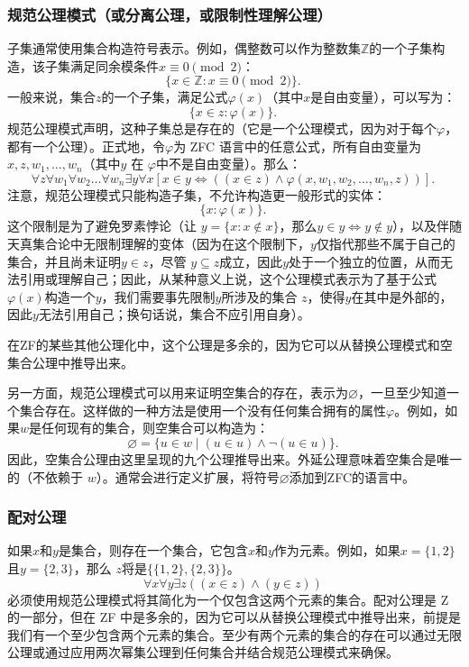 \subsubsection{规范公理模式（或分离公理，或限制性理解公理）}   
子集通常使用集合构造符号表示。例如，偶整数可以作为整数集\( \mathbb{Z} \)的一个子集构造，该子集满足同余模条件\( x \equiv 0 \pmod{2} \)：
\[
\{ x \in \mathbb{Z} : x \equiv 0 \pmod{2} \}.~
\]
一般来说，集合\( z \)的一个子集，满足公式\( \varphi(x) \)（其中\( x \)是自由变量），可以写为：
\[
\{ x \in z : \varphi(x) \}.~
\]
规范公理模式声明，这种子集总是存在的（它是一个公理模式，因为对于每个\( \varphi \)，都有一个公理）。正式地，令\( \varphi \)为 ZFC 语言中的任意公式，所有自由变量为 \( x, z, w_1, \ldots, w_n \)（其中\( y \) 在 \( \varphi \)中不是自由变量）。那么：
\[
\forall z \forall w_1 \forall w_2 \ldots \forall w_n \exists y \forall x \left[ x \in y \Leftrightarrow \left( (x \in z) \land \varphi(x, w_1, w_2, \ldots, w_n, z) \right) \right].~
\]
注意，规范公理模式只能构造子集，不允许构造更一般形式的实体：
\[
\{ x : \varphi(x) \}.~
\]
这个限制是为了避免罗素悖论（让 \( y = \{x : x \notin x\} \)，那么\( y \in y \Leftrightarrow y \notin y \)），以及伴随天真集合论中无限制理解的变体（因为在这个限制下，\( y \)仅指代那些不属于自己的集合，并且尚未证明\( y \in z \)，尽管 \( y \subseteq z \)成立，因此\( y \)处于一个独立的位置，从而无法引用或理解自己；因此，从某种意义上说，这个公理模式表示为了基于公式\( \varphi(x) \)构造一个\( y \)，我们需要事先限制\( y \)所涉及的集合 \( z \)，使得\( y \)在其中是外部的，因此\( y \)无法引用自己；换句话说，集合不应引用自身）。

在ZF的某些其他公理化中，这个公理是多余的，因为它可以从替换公理模式和空集合公理中推导出来。

另一方面，规范公理模式可以用来证明空集合的存在，表示为\( \varnothing \)，一旦至少知道一个集合存在。这样做的一种方法是使用一个没有任何集合拥有的属性\( \varphi \)。例如，如果\( w \)是任何现有的集合，则空集合可以构造为：
\[
\varnothing = \{ u \in w \mid (u \in u) \land \lnot (u \in u) \}.~
\]
因此，空集合公理由这里呈现的九个公理推导出来。外延公理意味着空集合是唯一的（不依赖于 \( w \)）。通常会进行定义扩展，将符号\( \varnothing \)添加到ZFC的语言中。
\subsubsection{配对公理}  
如果\( x \)和\( y \)是集合，则存在一个集合，它包含\( x \)和\( y \)作为元素。例如，如果\( x = \{1, 2\} \)且\( y = \{2, 3\} \)，那么 \( z \)将是\(\{\{1, 2\}, \{2, 3\}\}\)。
\[
\forall x \forall y \exists z \left( (x \in z) \land (y \in z) \right)~
\]
必须使用规范公理模式将其简化为一个仅包含这两个元素的集合。配对公理是 Z 的一部分，但在 ZF 中是多余的，因为它可以从替换公理模式中推导出来，前提是我们有一个至少包含两个元素的集合。至少有两个元素的集合的存在可以通过无限公理或通过应用两次幂集公理到任何集合并结合规范公理模式来确保。
